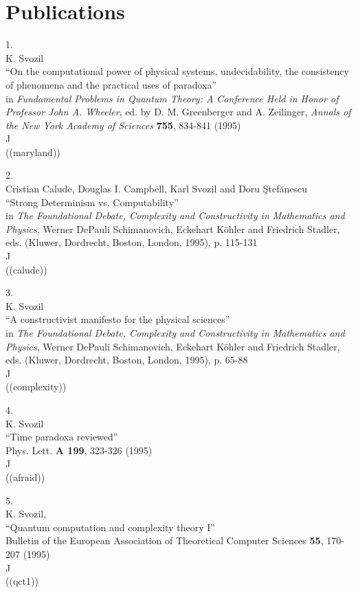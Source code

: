 

\section{Publications}

1.\\
 K. Svozil\\
``On the computational power of physical systems,
undecidability, the consistency of phenomena and
 the practical uses of paradoxa''\\
in {\sl Fundamental Problems in
Quantum Theory: A Conference Held in Honor of Professor John A.
Wheeler}, ed. by D. M. Greenberger and A. Zeilinger,  {\sl Annals of the
New York Academy of Sciences} {\bf 755}, 834-841 (1995)\\
J\\
((maryland))


2.\\
Cristian Calude,
Douglas I. Campbell,
 Karl Svozil and
Doru \c{S}tef\u anescu \\
``Strong Determinism vs.  Computability''\\
in {\it The Foundational Debate, Complexity and Constructivity in
Mathematics and Physics}, Werner DePauli Schimanovich, Eckehart K\"ohler
and Friedrich Stadler, eds. (Kluwer, Dordrecht, Boston, London, 1995),
p. 115-131\\
J\\
((calude))


3.\\
 K. Svozil\\
``A constructivist manifesto for the physical  sciences''\\
 in
{\it The Foundational Debate, Complexity and Constructivity in
Mathematics and Physics}, Werner DePauli Schimanovich, Eckehart K\"ohler
and Friedrich Stadler, eds. (Kluwer, Dordrecht, Boston, London, 1995),
p. 65-88\\
J         \\
((complexity))

4.\\
K. Svozil\\
``Time paradoxa reviewed''\\
 Phys. Lett. {\bf A 199}, 323-326 (1995)\\
J       \\
((afraid))


5.\\
 K. Svozil, \\
``Quantum computation and complexity theory I''\\
 Bulletin of the European Association of Theoretical Computer
Sciences {\bf 55}, 170-207 (1995)\\
J\\
((qct1))

